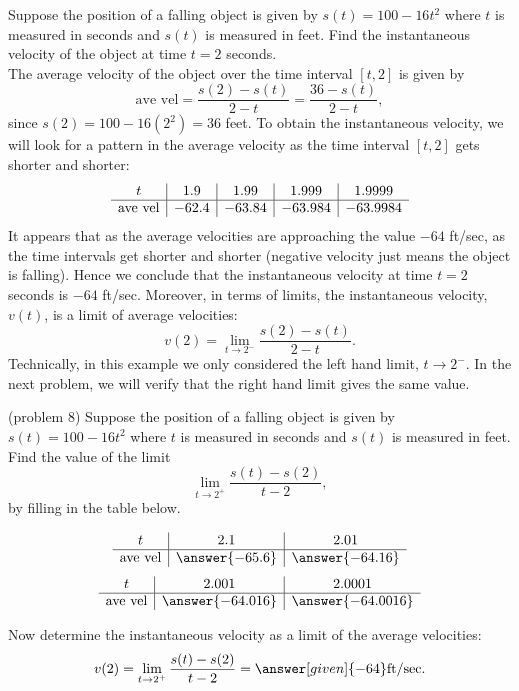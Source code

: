 \documentclass{ximera}
\begin{document}
\begin{example}[example 8]
Suppose the position of a falling object is given by $s(t) = 100-16t^2$ where $t$ is measured in seconds and $s(t)$ is measured in feet.
Find the instantaneous velocity of the object at time $t = 2$ seconds.\\
The average velocity of the object over the time interval $[t,2]$ is given by 
\[
\text{ave vel} = \frac{s(2)-s(t)}{2-t} = \frac{36-s(t)}{2-t},
\]
since $s(2) = 100 - 16(2^2) = 36$ feet.
To obtain the instantaneous velocity, we will look for a pattern in the average velocity as the time interval $[t, 2]$ gets shorter and shorter:
\[
\begin{array}{ c | c | c | c | c }
 t & 1.9 & 1.99  & 1.999 & 1.9999 \\ 
	\hline 
	 \text{ave vel} & -62.4 & -63.84 & -63.984 & -63.9984
\end{array}
\]  
It appears that as the average velocities are approaching the value $-64$ ft/sec, as the time intervals 
get shorter and shorter (negative velocity just means the object is falling).  Hence we conclude that the instantaneous velocity at time $t = 2$ seconds is $-64$ ft/sec.
Moreover, in terms of limits, the instantaneous velocity, $v(t)$, is a limit of average velocities:
\[
v(2) = \lim_{t\to 2^-} \frac{s(2) - s(t)}{2-t}.
\]
Technically, in this example we only considered the left hand limit, $t\to 2^-$.
In the next problem, we will verify that the right hand limit gives the same value. 
\end{example}

\begin{problem}(problem 8)
Suppose the position of a falling object is given by $s(t) = 100-16t^2$ where $t$ is measured in seconds and $s(t)$ is measured in feet.
Find the value of the limit
\[
\lim_{t\to 2^+} \frac{s(t) - s(2)}{t-2},
\]
by filling in the table below.

\begin{prompt}
\begin{center}
\[
\begin{array}{ c | c | c }
  t & 2.1 & 2.01   \\ 
	\hline 
	 \text{ave vel} & \answer{-65.6} & \answer{-64.16} 
\end{array}
\]
\[
\begin{array}{ c | c | c  }
  t  & 2.001 & 2.0001 \\ 
	\hline 
	 \text{ave vel} & \answer{-64.016} & \answer{-64.0016}
\end{array}
\]
\end{center}
Now determine the instantaneous velocity as a limit of the average velocities:
\[
v(2) = \lim_{t\to 2^+} \frac{s(t) - s(2)}{t-2} = \answer[given]{-64} \text{ft/sec}.
\]
\end{prompt}



\end{problem}


\begin{center}
\begin{foldable}
\end{foldable}
\end{center}
\end{document}
